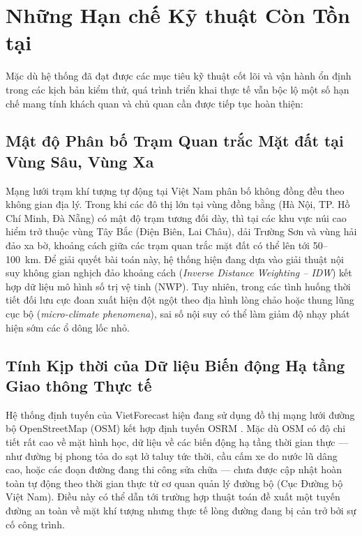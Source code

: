 \section{Những Hạn chế Kỹ thuật Còn Tồn tại}
\label{sec:limitations}

Mặc dù hệ thống đã đạt được các mục tiêu kỹ thuật cốt lõi và vận hành ổn định trong các kịch bản kiểm thử, quá trình triển khai thực tế vẫn bộc lộ một số hạn chế mang tính khách quan và chủ quan cần được tiếp tục hoàn thiện:

\subsection{Mật độ Phân bố Trạm Quan trắc Mặt đất tại Vùng Sâu, Vùng Xa}
Mạng lưới trạm khí tượng tự động tại Việt Nam phân bố không đồng đều theo không gian địa lý. Trong khi các đô thị lớn tại vùng đồng bằng (Hà Nội, TP. Hồ Chí Minh, Đà Nẵng) có mật độ trạm tương đối dày, thì tại các khu vực núi cao hiểm trở thuộc vùng Tây Bắc (Điện Biên, Lai Châu), dải Trường Sơn và vùng hải đảo xa bờ, khoảng cách giữa các trạm quan trắc mặt đất có thể lên tới 50--100~km. 
Để giải quyết bài toán này, hệ thống hiện đang dựa vào giải thuật nội suy không gian nghịch đảo khoảng cách (\textit{Inverse Distance Weighting -- IDW}) \cite{shepard1968} kết hợp dữ liệu mô hình số trị vệ tinh (NWP). Tuy nhiên, trong các tình huống thời tiết đối lưu cực đoan xuất hiện đột ngột theo địa hình lòng chảo hoặc thung lũng cục bộ (\textit{micro-climate phenomena}), sai số nội suy có thể làm giảm độ nhạy phát hiện sớm các ổ dông lốc nhỏ.

\subsection{Tính Kịp thời của Dữ liệu Biến động Hạ tầng Giao thông Thực tế}
Hệ thống định tuyến của VietForecast hiện đang sử dụng đồ thị mạng lưới đường bộ OpenStreetMap (OSM) \cite{haklay2008openstreetmap} kết hợp định tuyến OSRM \cite{luxen2011real, geisberger2008contraction}. Mặc dù OSM có độ chi tiết rất cao về mặt hình học, dữ liệu về các biến động hạ tầng thời gian thực --- như đường bị phong tỏa do sạt lở taluy tức thời, cầu cấm xe do nước lũ dâng cao, hoặc các đoạn đường đang thi công sửa chữa --- chưa được cập nhật hoàn toàn tự động theo thời gian thực từ cơ quan quản lý đường bộ (Cục Đường bộ Việt Nam). Điều này có thể dẫn tới trường hợp thuật toán đề xuất một tuyến đường an toàn về mặt khí tượng nhưng thực tế lòng đường đang bị cản trở bởi sự cố công trình.

